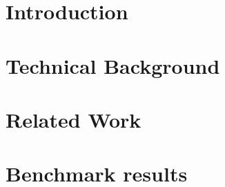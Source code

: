 



\frenchspacing
\raggedbottom
{} %
\pagestyle{plain}



\cleardoublepage
\cleardoublepage
\cleardoublepage
\pagestyle{scrheadings}
\cleardoublepage
\cleardoublepage
\chapter{Introduction}
 
\cleardoublepage

\chapter{Technical Background}

\chapter{Related Work}


\chapter{Benchmark results}

